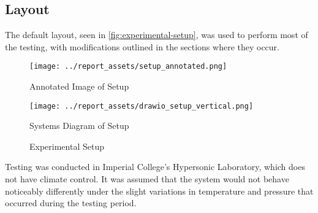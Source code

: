 \subsection{Layout}
The default layout, seen in \autoref{fig:experimental-setup}, was used to perform most of the testing, with modifications outlined in the sections where they occur. 
\begin{figure}[htbp]
    \centering

    \begin{minipage}{0.6\textwidth}
        \centering
        \texttt{[image: ../report\_assets/setup\_annotated.png]}
        \caption*{Annotated Image of Setup}
    \end{minipage}
    \hfill
    \begin{minipage}{0.3\textwidth}
        \centering
        \texttt{[image: ../report\_assets/drawio\_setup\_vertical.png]}
        \caption*{Systems Diagram of Setup}
    \end{minipage}
    \caption{Experimental Setup}\label{fig:experimental-setup}
\end{figure}
Testing was conducted in Imperial College's Hypersonic Laboratory, which does not have climate control. It was assumed that the system would not behave noticeably differently under the slight variations in temperature and pressure that occurred during the testing period.

